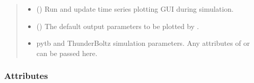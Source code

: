 \documentclass[letterpaper,10pt,english,openany,oneside]{sphinxmanual}
\begin{document}
\begin{fulllineitems}
\begin{quote}
\begin{description}
\begin{itemize}
\item {} 
\sphinxAtStartPar
{} () \textendash{} Run and update time series plotting GUI during simulation.

\item {} 
\sphinxAtStartPar
{} (\sphinxstyleliteralemphasis{\sphinxupquote{{[}}}\sphinxstyleliteralemphasis{\sphinxupquote{{]}}}) \textendash{} The default output parameters to be plotted
by {\hyperref[\detokenize{api/pytb.ThunderBoltz.plot_timeseries:pytb.ThunderBoltz.plot_timeseries}]{}}.

\item {} 
\sphinxAtStartPar
{} \textendash{} pytb and ThunderBoltz simulation parameters. Any attributes of
{\hyperref[\detokenize{api/pytb.parameters.TBParameters:pytb.parameters.TBParameters}]{}} or
{\hyperref[\detokenize{api/pytb.parameters.WrapParameters:pytb.parameters.WrapParameters}]{}} can be passed here.

\end{itemize}

\end{description}\end{quote}
\subsubsection*{Attributes}



\end{fulllineitems}
\end{document}
